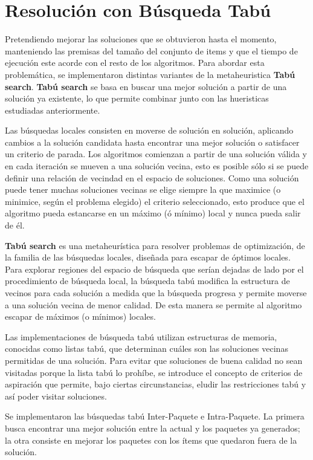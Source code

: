 \section{Resolución con Búsqueda Tabú}
Pretendiendo mejorar las soluciones que se obtuvieron hasta el momento, manteniendo las premisas del tamaño del conjunto de items y que el tiempo de ejecución este acorde con el resto de los algoritmos. Para abordar esta problemática, se implementaron distintas variantes de la metaheuristica \textbf{Tabú search}. \textbf{Tabú search} se basa en buscar una mejor solución a partir de una solución ya existente, lo que permite combinar junto con las hueristicas estudiadas anteriormente.

Las búsquedas locales consisten en moverse de solución en solución, aplicando cambios a la solución candidata hasta encontrar una mejor solución o satisfacer un criterio de parada. Los algoritmos comienzan a partir de una solución válida y en cada iteración se mueven a una solución vecina, esto es posible sólo si se puede definir una relación de vecindad en el espacio de soluciones. Como una solución puede tener muchas soluciones vecinas se elige siempre la que maximice (o minimice, según el problema elegido) el criterio seleccionado, esto produce que el algoritmo pueda estancarse en un máximo (ó mínimo) local y nunca pueda salir de él.

\textbf{Tabú search}\cite{TS-1,TS-2} es una metaheurística para resolver problemas de optimización, de la familia de las búsquedas locales, diseñada para escapar de óptimos locales. Para explorar regiones del espacio de búsqueda que serían dejadas de lado por el procedimiento de búsqueda local, la búsqueda tabú modifica la estructura de vecinos para cada solución a medida que la búsqueda progresa y permite moverse a una solución vecina de menor calidad. De esta manera se permite al algoritmo escapar de máximos (o mínimos) locales.

Las implementaciones de búsqueda tabú utilizan estructuras de memoria, conocidas como listas tabú, que determinan cuáles son las soluciones vecinas permitidas de una solución. Para evitar que soluciones de buena calidad no sean visitadas porque la lista tabú lo prohíbe, se introduce el concepto de criterios de aspiración que permite, bajo ciertas circunstancias, eludir las restricciones tabú y así poder visitar soluciones.

Se implementaron las búsquedas tabú Inter-Paquete e Intra-Paquete. La primera busca encontrar una mejor solución entre la actual y los paquetes ya generados; la otra consiste en mejorar los paquetes con los ítems que quedaron fuera de la solución.

